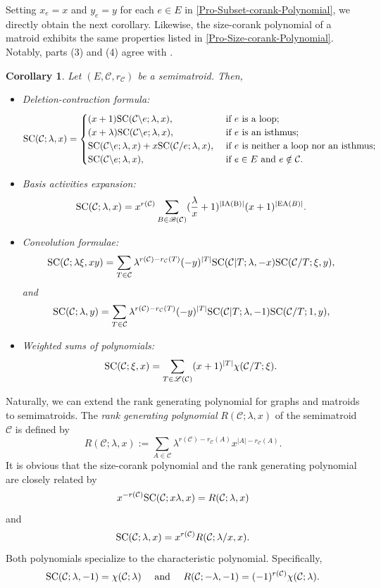 \documentclass[12pt]{article}%
\numberwithin{equation}{section}
\def\And{\mbox{\rm ~and~}}
\newtheorem{corollary}[corollary]{Corollary}
\begin{document}
Setting $x_e=x$ and $y_e=y$ for each $e\in E$ in \autoref{Pro-Subset-corank-Polynomial}, we directly obtain the next corollary. Likewise, the size-corank polynomial of a matroid exhibits the same properties listed in \autoref{Pro-Size-corank-Polynomial}. Notably, parts (3) and (4) agree with \cite[Identity 2 and Identity 5]{Kung2010}.
\begin{corollary}\label{Pro-Size-corank-Polynomial}
Let $(E,\mathcal{C},r_{\mathcal{C}})$ be a semimatroid. Then,
\begin{itemize}
\item[{\rm (1)}] Deletion-contraction formula:
\[
{\rm SC}(\mathcal{C};\lambda,x)=
\begin{cases}
(x+1){\rm SC}(\mathcal{C}\backslash e;\lambda, x),&\text{ if } e \text{ is a loop};\\
(x+\lambda){\rm SC}(\mathcal{C}\backslash e;\lambda,x),&\text{ if } e \text{ is an isthmus};\\
{\rm SC}(\mathcal{C}\backslash e;\lambda,x)+x{\rm SC}(\mathcal{C}/e;\lambda,x),&\text{ if } e \text{ is neither a loop nor an isthmus};\\
{\rm SC}(\mathcal{C}\backslash e;\lambda,x),&\text{ if } e\in E \text{ and } e\notin\mathcal{C}.
\end{cases}
\]
\item[{\rm (2)}]Basis activities expansion:
\[
{\rm SC}(\mathcal{C};\lambda,x)=x^{r(\mathcal{C})}\sum_{B\in\mathscr{B}(\mathcal{C})}(\frac{\lambda}{x}+1)^{|{\rm IA(B)}|}(x+1)^{|{\rm EA}(B)|}.
\]
\item[{\rm (3)}] Convolution formulae:
\[
{\rm SC}(\mathcal{C};\lambda\xi,xy)=\sum_{T\in\mathcal{C}}\lambda^{r(\mathcal{C})-r_{\mathcal{C}}(T)}(-y)^{|T|}{\rm SC}(\mathcal{C}|T;\lambda,-x){\rm SC}(\mathcal{C}/T;\xi,y),
\]
and
\[
{\rm SC}(\mathcal{C};\lambda,y)=\sum_{T\in\mathcal{C}}\lambda^{r(\mathcal{C})-r_{\mathcal{C}}(T)}(-y)^{|T|}{\rm SC}(\mathcal{C}|T;\lambda,-1){\rm SC}(\mathcal{C}/T;1,y),
\]
\item[{\rm (4)}] Weighted sums of polynomials:
\[
{\rm SC}(\mathcal{C};\xi,x)=\sum_{T\in\mathscr{L}(\mathcal{C})}(x+1)^{|T|}\chi(\mathcal{C}/T;\xi).
\]
\end{itemize}
\end{corollary}

Naturally, we can extend the rank generating polynomial for graphs and matroids to semimatroids. The {\em rank generating polynomial} $R(\mathcal{C};\lambda,x)$ of the semimatroid $\mathcal{C}$ is defined by 
\[
R(\mathcal{C};\lambda,x):=\sum_{A\in\mathcal{C}}\lambda^{r(\mathcal{C})-r_{\mathcal{C}}(A)}x^{|A|-r_{\mathcal{C}}(A)}.
\]
It is obvious that the size-corank polynomial and the rank generating polynomial are closely related by
\[
x^{-r(\mathcal{C})}{\rm SC}(\mathcal{C};x\lambda,x)=R(\mathcal{C};\lambda,x)
\]
and
\begin{equation}\label{Relation3}
{\rm SC}(\mathcal{C};\lambda,x)=x^{r(\mathcal{C})}R(\mathcal{C};\lambda/x,x).
\end{equation}
Both polynomials specialize to the characteristic polynomial. Specifically,
\[
{\rm SC}(\mathcal{C};\lambda,-1)=\chi(\mathcal{C};\lambda)\quad\And\quad R(\mathcal{C};-\lambda,-1)=(-1)^{r(\mathcal{C})}\chi(\mathcal{C};\lambda).
\]
\end{document}
